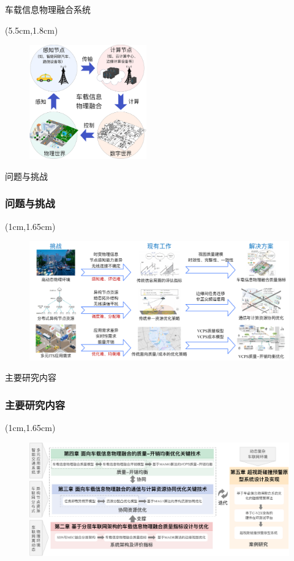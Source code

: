\begin{frame}{车载信息物理融合系统}
\begin{center}
\begin{textblock*}{\textwidth}(5.5cm,1.8cm)
\begin{figure}
\includegraphics[width=0.45\textwidth]{fig/vcps.pdf}
\end{figure}
\end{textblock*}
\end{center}
\end{frame}

\begin{frame}{问题与挑战}
\frametitle{\englishfont 问题与挑战}
\newBackground
\begin{center}
\begin{textblock*}{\textwidth}(1cm,1.65cm)
\begin{figure}
\includegraphics[width=1\textwidth]{fig/challenges.pdf}
\end{figure}
\end{textblock*}
\end{center}
\end{frame}


\begin{frame}{主要研究内容}
\frametitle{\englishfont 主要研究内容}
\newBackground
\begin{center}
\begin{textblock*}{\textwidth}(1cm,1.65cm)
\begin{figure}
\includegraphics[width=1.05\textwidth]{fig/research_content.pdf}
\end{figure}
\end{textblock*}
\end{center}
\end{frame}